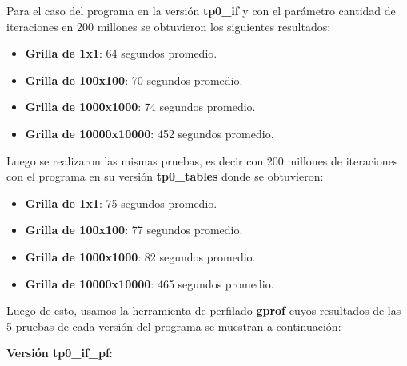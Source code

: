 \documentclass[a4paper, 10pt, twoside, notitlepage]{article}
\begin{document}
Para el caso del programa en la versión \textbf{tp0\_if} y con el parámetro cantidad de iteraciones en 200 millones se obtuvieron los siguientes resultados:

\begin{itemize} 
\item[] \textbf{Grilla de 1x1}: 64 segundos promedio.
\item[] \textbf{Grilla de 100x100}: 70 segundos promedio.
\item[] \textbf{Grilla de 1000x1000}: 74 segundos promedio.
\item[] \textbf{Grilla de 10000x10000}: 452 segundos promedio.
\end{itemize}

Luego se realizaron las mismas pruebas, es decir con 200 millones de iteraciones con el programa en su versión \textbf{tp0\_tables} donde se obtuvieron: 
\begin{itemize} 
\item[] \textbf{Grilla de 1x1}: 75 segundos promedio.
\item[] \textbf{Grilla de 100x100}: 77 segundos promedio.
\item[] \textbf{Grilla de 1000x1000}: 82 segundos promedio.
\item[] \textbf{Grilla de 10000x10000}: 465 segundos promedio.
\end{itemize}

Luego de esto, usamos la herramienta de perfilado \textbf{gprof} cuyos resultados de las 5 pruebas de cada versión del programa se muestran a continuación:

\textbf{Versión tp0\_if\_pf}:
\end{document}
